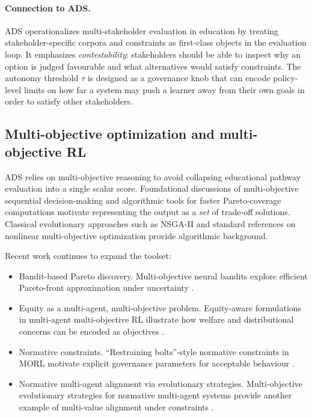 \paragraph{Connection to ADS.}
ADS operationalizes multi-stakeholder evaluation in education by treating stakeholder-specific corpora and constraints as first-class objects in the evaluation loop.
It emphasizes \emph{contestability}: stakeholders should be able to inspect why an option is judged favourable and what alternatives would satisfy constraints.
The autonomy threshold $\tau$ is designed as a governance knob that can encode policy-level limits on how far a system may push a learner away from their own goals in order to satisfy other stakeholders.

\subsection{Multi-objective optimization and multi-objective RL}
\label{sec:rw-moo}

ADS relies on multi-objective reasoning to avoid collapsing educational pathway evaluation into a single scalar score.
Foundational discussions of multi-objective sequential decision-making \cite{roijers2013survey_mosdm} and algorithmic tools for faster Pareto-coverage computations \cite{roijers2015convex} motivate representing the output as a \emph{set} of trade-off solutions.
Classical evolutionary approaches such as NSGA-II \cite{deb2002nsga2} and standard references on nonlinear multi-objective optimization \cite{miettinen1999nonlinearMOO} provide algorithmic background.

Recent work continues to expand the toolset:
\begin{itemize}
    \item {Bandit-based Pareto discovery.} Multi-objective neural bandits explore efficient Pareto-front approximation under uncertainty \cite{monb2025}.
    \item {Equity as a multi-agent, multi-objective problem.} Equity-aware formulations in multi-agent multi-objective RL illustrate how welfare and distributional concerns can be encoded as objectives \cite{equityMAMORL2025}.
    \item {Normative constraints.} ``Restraining bolts''-style normative constraints in MORL motivate explicit governance parameters for acceptable behaviour \cite{restrainingBolts2025}.
    \item {Normative multi-agent alignment via evolutionary strategies.} Multi-objective evolutionary strategies for normative multi-agent systems provide another example of multi-value alignment under constraints \cite{riad2025nova}.
\end{itemize}

